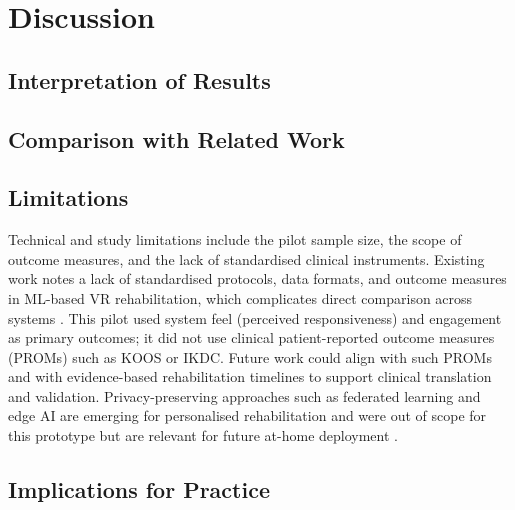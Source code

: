 
\chapter{Discussion}\label{ch:discussion}

\section{Interpretation of Results}

\section{Comparison with Related Work}

\section{Limitations}

Technical and study limitations include the pilot sample size, the scope of outcome measures, and the lack of standardised clinical instruments. Existing work notes a lack of standardised protocols, data formats, and outcome measures in ML-based VR rehabilitation, which complicates direct comparison across systems \cite{wang2025airehab, plavoukou2025sensors}. This pilot used system feel (perceived responsiveness) and engagement as primary outcomes; it did not use clinical patient-reported outcome measures (PROMs) such as KOOS or IKDC. Future work could align with such PROMs and with evidence-based rehabilitation timelines to support clinical translation and validation. Privacy-preserving approaches such as federated learning and edge AI are emerging for personalised rehabilitation and were out of scope for this prototype but are relevant for future at-home deployment \cite{piechowiak2025wearables, chen2025federated}.

\section{Implications for Practice}
